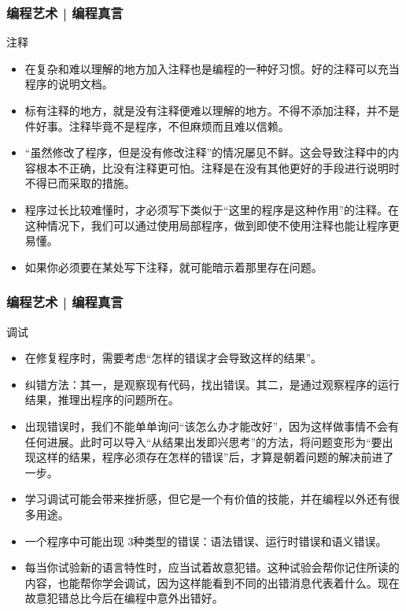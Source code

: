\begin{frame}
  \frametitle{编程艺术 | 编程真言}
  \begin{block}{注释}
    \begin{itemize}
      \item 在复杂和难以理解的地方加入\alert{注释}也是编程的一种好习惯。好的注释可以充当程序的说明文档。
      \item 标有注释的地方，就是没有注释便难以理解的地方。不得不添加注释，并不是件好事。注释毕竟不是程序，不但麻烦而且难以信赖。
      \item “虽然修改了程序，但是没有修改注释”的情况屡见不鲜。这会导致注释中的内容根本不正确，比没有注释更可怕。注释是在没有其他更好的手段进行说明时不得已而采取的措施。
      \item 程序过长比较难懂时，才必须写下类似于“这里的程序是这种作用”的注释。在这种情况下，我们可以通过使用局部程序，做到即使不使用注释也能让程序更易懂。
      \item 如果你必须要在某处写下注释，就可能暗示着那里存在问题。
    \end{itemize}
  \end{block}
\end{frame}

\begin{frame}
  \frametitle{编程艺术 | 编程真言}
  \begin{block}{调试}
    \begin{itemize}
      \item 在修复程序时，需要考虑“怎样的错误才会导致这样的结果”。
      \item \alert{纠错方法}：其一，是观察现有代码，找出错误。其二，是通过观察程序的运行结果，推理出程序的问题所在。
      \item 出现错误时，我们不能单单询问“该怎么办才能改好”，因为这样做事情不会有任何进展。此时可以导入“从结果出发即兴思考”的方法，将问题变形为“要出现这样的结果，程序必须存在怎样的错误”后，才算是朝着问题的解决前进了一步。
      \item \alert{学习调试}可能会带来挫折感，但它是一个有价值的技能，并在编程以外还有很多用途。
      \item 一个程序中可能出现 \alert{3种类型的错误}：语法错误、运行时错误和语义错误。
      \item 每当你试验新的语言特性时，应当试着故意犯错。这种试验会帮你记住所读的内容，也能帮你学会调试，因为这样能看到不同的出错消息代表着什么。现在故意犯错总比今后在编程中意外出错好。
    \end{itemize}
  \end{block}
\end{frame}

